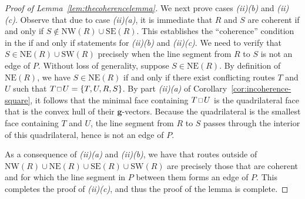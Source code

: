 \documentclass[10pt,a4paper]{amsart}
\newcommand\NE{\mathrm{NE}}
\newcommand\NW{\mathrm{NW}}
\newcommand\SE{\mathrm{SE}}
\newcommand\SW{\mathrm{SW}}
\newcommand\bg{\mathbf{g}}
\newcommand\squarette{\scalebox{0.75}{\hbox{$\,\square\,$}}}
\begin{document}
\begin{proof}[Proof of Lemma~\ref{lem:thecoherencelemma}]
We next prove cases \textit{(ii)(b)} and \textit{(ii)(c)}. 
Observe that due to case \textit{(ii)(a)}, it is immediate that $R$ and $S$ are coherent if and only if $S\notin \NW(R)\cup \SE(R)$.
This establishes the ``coherence'' condition in the if and only if statements for \textit{(ii)(b)} and \textit{(ii)(c)}.
We need to verify that $S\in \NE(R)\cup\SW(R)$ precisely when the line segment from $R$ to $S$ is not an edge of $P$.
Without loss of generality, suppose $S\in \NE(R)$.
By definition of $\NE(R)$, we have $S\in \NE(R)$ if and only if there exist conflicting routes $T$ and $U$ such that $T\squarette U=\{T,U,R,S\}$.
By part \textit{(ii)(a)} of Corollary~\ref{cor:incoherence-square}, it follows that the minimal face containing $T\squarette U$ is the quadrilateral face that is the convex hull of their $\bg$-vectors.
Because the quadrilateral is the smallest face containing $T$ and $U$, the line segment from $R$ to $S$ passes through the interior of this quadrilateral, hence is not an edge of $P$.

As a consequence of \textit{(ii)(a)} and \textit{(ii)(b)}, we have that routes outside of $\NW(R)\cup \NE(R)\cup \SE(R)\cup \SW(R)$ are precisely those that are coherent and for which the line segment in $P$ between them forms an edge of $P$.
This completes the proof of \textit{(ii)(c)}, and thus the proof of the lemma is complete.
\end{proof}
\end{document}
